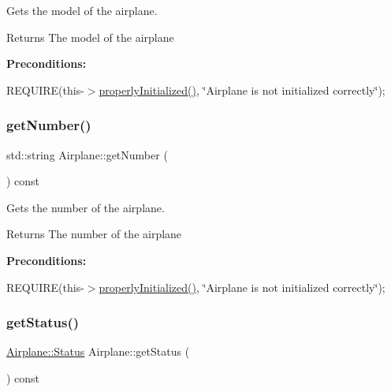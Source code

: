 Gets the model of the airplane. 

\begin{DoxyReturn}{Returns}
The model of the airplane
\end{DoxyReturn}
{\bfseries Preconditions\+:}
\begin{DoxyItemize}
\item R\+E\+Q\+U\+I\+RE(this-\/$>$\mbox{\hyperlink{class_airplane_a6f80df8f692cc8d67d292c1e9f26d59e}{properly\+Initialized()}}, \char`\"{}\+Airplane is not initialized correctly\char`\"{}); 
\end{DoxyItemize}\mbox{\label{class_airplane_a29068c4308e9aef5f8d944840b4dba10}} 
\subsubsection{\texorpdfstring{get\+Number()}{getNumber()}}
{\footnotesize\ttfamily std\+::string Airplane\+::get\+Number (\begin{DoxyParamCaption}{ }\end{DoxyParamCaption}) const}



Gets the number of the airplane. 

\begin{DoxyReturn}{Returns}
The number of the airplane
\end{DoxyReturn}
{\bfseries Preconditions\+:}
\begin{DoxyItemize}
\item R\+E\+Q\+U\+I\+RE(this-\/$>$\mbox{\hyperlink{class_airplane_a6f80df8f692cc8d67d292c1e9f26d59e}{properly\+Initialized()}}, \char`\"{}\+Airplane is not initialized correctly\char`\"{}); 
\end{DoxyItemize}\mbox{\label{class_airplane_a35967a392b7274dc6a874bf3b73b7965}} 
\subsubsection{\texorpdfstring{get\+Status()}{getStatus()}}
{\footnotesize\ttfamily \mbox{\hyperlink{class_airplane_a2fe18f372ef9acb9d557998a560ad66e}{Airplane\+::\+Status}} Airplane\+::get\+Status (\begin{DoxyParamCaption}{ }\end{DoxyParamCaption}) const}



